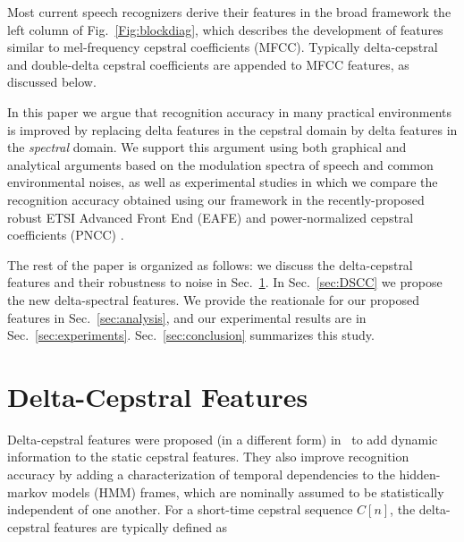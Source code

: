 \documentclass{article}
\begin{document}
Most  current speech recognizers derive their features in the broad framework the left column of Fig.~\ref{Fig:blockdiag}, which describes the development of features similar to mel-frequency cepstral coefficients (MFCC).  Typically delta-cepstral and double-delta cepstral coefficients are appended to MFCC features, as discussed below.


In this paper we argue that recognition accuracy in many practical environments is improved by replacing delta features in the cepstral domain by delta features in the \emph{spectral} domain.  We support this argument using both graphical and analytical arguments based on the modulation spectra of speech and common environmental noises, as well as experimental studies in which we compare the recognition accuracy obtained using our framework in
the recently-proposed robust  ETSI Advanced Front End (EAFE)  \cite{AFE} and power-normalized cepstral coefficients (PNCC) \cite{PNCC10}.

The rest of the paper is organized as follows: we discuss the delta-cepstral features and their robustness
to noise in Sec.~\ref{sec:DCC}. In Sec.~\ref{sec:DSCC} we propose the new delta-spectral features. We provide
the reationale for our proposed features in Sec.~\ref{sec:analysis}, and our experimental results are in  Sec.~\ref{sec:experiments}. Sec.~\ref{sec:conclusion} summarizes this study.

\section{Delta-Cepstral Features}\label{sec:DCC}
Delta-cepstral features were proposed (in a different form) in~\cite{Furui86} to add dynamic information to the
 static cepstral features.  They also improve recognition accuracy by adding a characterization of temporal dependencies to the hidden-markov models (HMM) frames, which are nominally assumed to be statistically independent of one another.  For a short-time cepstral sequence $C[n]$, the delta-cepstral features are typically defined as
\end{document}
